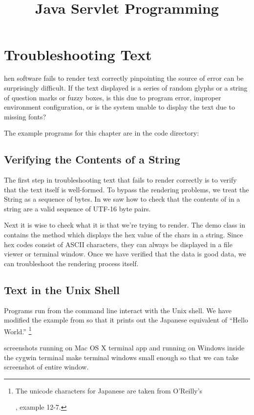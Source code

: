 \chapter{Troubleshooting Text}\label{chap:text-trouble}

hen software fails to render text correctly
pinpointing the source of error can be surprisingly difficult.
If the text displayed is a series of random glyphs or a string of
question marks or fuzzy boxes, is this due to program error,
improper environment configuration, or is the system unable to
display the text due to missing fonts?

The example programs for this chapter are in the code directory:
%

\section{Verifying the Contents of a String}

The first step in troubleshooting text that fails to render correctly
is to verify that the text itself is well-formed.
To bypass the rendering problems, we treat the String as a sequence of bytes.
In  we saw how to check that
the contents of in a string are a valid sequence of UTF-16 byte pairs.

Next it is wise to check what it is that we're trying to render.
The demo class  in 
contains the method 
which displays the hex value of the chars in a string.
Since hex codes consist of ASCII characters, they can always
be displayed in a file viewer or terminal window.
%
%
Once we have verified that the data is good data, we can
troubleshoot the rendering process itself.

\section{Text in the Unix Shell}

Programs run from the command line interact with the Unix shell.
We have modified the  example from 
so that it prints out the Japanese equivalent of ``Hello World.''%
%
\footnote{The unicode characters for Japanese are taken from
O'Reilly's \title{Java Servlet Programming}, example 12-7.}
%
%

screenshots running on Mac OS X terminal app
and running on Windows inside the cygwin terminal
make terminal windows small enough so that we can take screenshot
of entire window.

